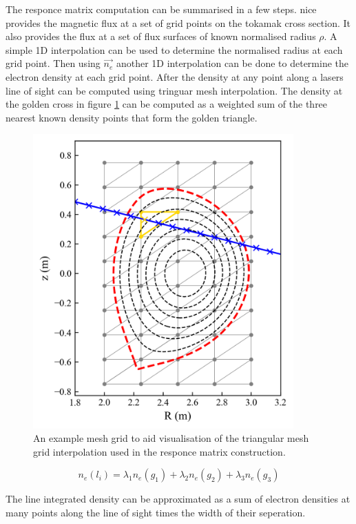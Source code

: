 The responce matrix computation can be summarised in a few steps. \Gls{nice} provides the magnetic flux at a set of grid points on the tokamak cross section. It also provides the flux at a set of flux surfaces of known normalised radius $\rho$. A simple 1D interpolation can be used to determine the normalised radius at each grid point. Then using $\vec{n_e}$ another 1D interpolation can be done to determine the electron density at each grid point. After the density at any point along a lasers line of sight can be computed using tringuar mesh interpolation. The density at the golden cross in figure \ref{fig:meshtriangle} can be computed as a weighted sum of the three nearest known density points that form the golden triangle.

\begin{figure}
  \centering
  \includegraphics[width=10cm]{images/meshtriangle.png}
  \caption{An example mesh grid to aid visualisation of the triangular mesh grid interpolation used in the responce matrix construction.}
  \label{fig:meshtriangle}
\end{figure}

\begin{equation}
  n_e(l_i) = \lambda_1 n_e(g_1) + \lambda_2 n_e(g_2) + \lambda_3 n_e(g_3)
\end{equation}

The line integrated density can be approximated as a sum of electron densities at many points along the line of sight times the width of their seperation.

